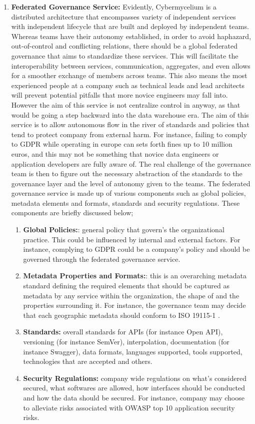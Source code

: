 \documentclass[review]{elsarticle}
\begin{document}
\begin{enumerate}
    \item  \textbf{Federated Governance Service:} Evidently, Cybermycelium is a distributed architecture that encompasses variety of independent services with independent lifecycle that are built and deployed by independent teams. Whereas teams have their autonomy established, in order to avoid haphazard, out-of-control and conflicting relations, there should be a global federated governance that aims to standardize these services. This will facilitate the interoperability between services, communication, aggregates, and even allows for a smoother exchange of members across teams. This also means the most experienced people at a company such as technical leads and lead architects will prevent potential pitfalls that more novice engineers may fall into. However the aim of this service is not centralize control in anyway, as that would be going a step backward into the data warehouse era. The aim of this service is to allow autonomous flow in the river of standards and policies that tend to protect company from external harm. For instance, failing to comply to GDPR while operating in europe can sets forth fines up to 10 million euros, and this may not be something that novice data engineers or application developers are fully aware of. The real challenge of the governance team is then to figure out the necessary abstraction of the standards to the governance layer and the level of autonomy given to the teams. The federated governance service is made up of various components such as global policies, metadata elements and formats, standards and security regulations. These components are briefly discussed below;
    \begin{enumerate}
        \item \textbf{Global Policies:}: general policy that govern's the organizational practice. This could be influenced by internal and external factors. For instance, complying to GDPR could be a company's policy and should be governed through the federated governance service.
        \item \textbf{Metadata Properties and Formats:}: this is an overarching metadata standard defining the required elements that should be captured as metadata by any service within the organization, the shape of and the properties surrounding it. For instance, the governance team may decide that each geographic metadata should conform to ISO 19115-1 \cite{ISOMetadata}.
        \item \textbf{Standards:} overall standards for APIs (for instance Open API), versioning (for instance SemVer), interpolation, documentation (for instance Swagger), data formats, languages supported, tools supported, technologies that are accepted and others.
        \item \textbf{Security Regulations:} company wide regulations on what's considered secured, what softwares are allowed, how interfaces should be conducted and how the data should be secured. For instance, company may choose to alleviate risks associated with OWASP top 10 application security risks.
    \end{enumerate}


\end{enumerate}
\end{document}
